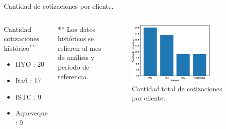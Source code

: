 \documentclass[aspectratio=169,xcolor=dvipsnames]{beamer}
\begin{document}


\begin{frame}{Cantidad de cotizaciones por cliente.}

\begin{columns}[c]

\begin{block}{Cantidad cotizaciones histórico$^{**}$}
\begin{itemize}
    \item  HYO : 20
    \item  Itaú : 17
    \item  ISTC : 9
    \item  Aqueveque : 9
\end{itemize}
\end{block}
\begin{block}{}
    \tiny{** Los datos históricos se refieren al mes de análisis y período de referencia.}
\end{block}

\begin{figure}
     \includegraphics[width=0.8\textwidth]{EPS/cliente_cantidad_total.eps}
     \caption{Cantidad total de cotizaciones por cliente.}
     \label{graph:cotizacion_max_cliente}
\end{figure}
\end{columns}
    
\end{frame}

\end{document}

